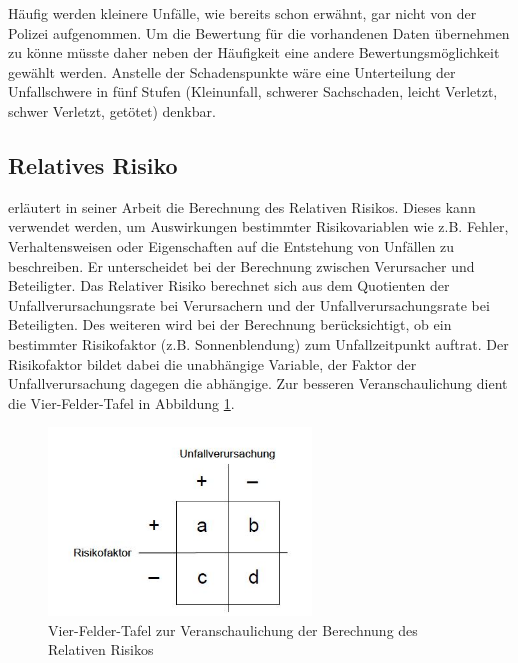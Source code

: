 Häufig werden kleinere Unfälle, wie bereits schon erwähnt, gar nicht von der Polizei aufgenommen. Um die Bewertung für die vorhandenen Daten übernehmen zu könne müsste daher neben der Häufigkeit eine andere Bewertungsmöglichkeit gewählt werden. Anstelle der Schadenspunkte wäre eine Unterteilung der Unfallschwere in fünf Stufen (Kleinunfall, schwerer Sachschaden, leicht Verletzt, schwer Verletzt, getötet) denkbar.

\subsection{Relatives Risiko}
\Textcite[S. 112f]{Grundl.2005} erläutert in seiner Arbeit die Berechnung des Relativen Risikos. Dieses kann verwendet werden, um Auswirkungen bestimmter Risikovariablen wie z.B. Fehler, Verhaltensweisen oder Eigenschaften auf die Entstehung von Unfällen zu beschreiben. Er unterscheidet bei der Berechnung zwischen Verursacher und Beteiligter. Das Relativer Risiko berechnet sich aus dem Quotienten der Unfallverursachungsrate bei Verursachern und der Unfallverursachungsrate bei Beteiligten. %
Des weiteren wird bei der Berechnung berücksichtigt, ob ein bestimmter Risikofaktor (z.B. Sonnenblendung) zum Unfallzeitpunkt auftrat. Der Risikofaktor bildet dabei die unabhängige Variable, der Faktor der Unfallverursachung dagegen die abhängige. Zur besseren Veranschaulichung dient die Vier-Felder-Tafel in Abbildung \ref{fig:Relatives Risiko}. 

\begin{savenotes}
	\begin{figure}[H]
		\centering
		\includegraphics[width=7cm,height=5cm]{figures/Relatives_Risiko}
		\caption[Vier-Felder-Tafel zur Veranschaulichung der Berechnung des Relativen Risikos]{Vier-Felder-Tafel zur Veranschaulichung der Berechnung des Relativen Risikos \parencite[S. 113]{Grundl.2005}}\label{fig:Relatives Risiko}
	\end{figure}
\end{savenotes}

